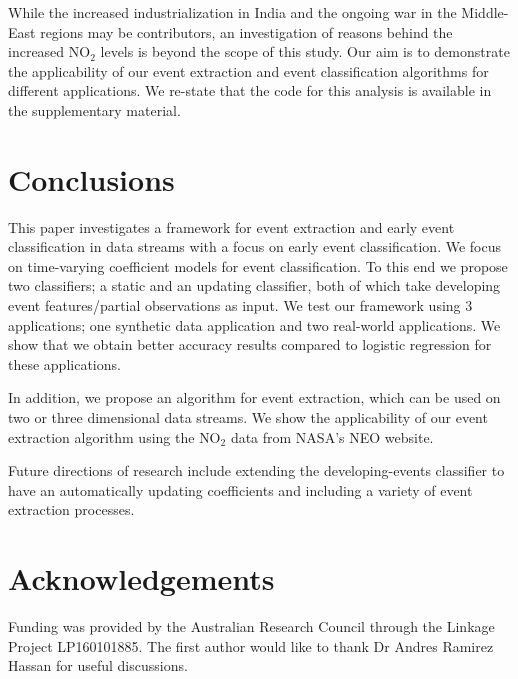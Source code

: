 \documentclass[a4paper,11pt]{article}
\begin{document}
While the increased industrialization in India and the ongoing war in the Middle-East regions may be contributors, an investigation of reasons behind the increased $\text{NO}_2$ levels is beyond the scope of this study. Our aim is to demonstrate the applicability of our event extraction and event classification algorithms for different applications. We re-state that the code for this analysis is available in the supplementary material.

\section{Conclusions}\label{sec:Conclusions}

This paper investigates a framework for event extraction and early event classification in data streams with a focus on early event classification. We focus on time-varying coefficient models for event classification. To this end we propose two classifiers; a static and an updating classifier, both of which take developing event features/partial observations as input. We test our framework using 3 applications; one synthetic data application and two real-world applications. We show that we obtain better accuracy results compared to logistic regression for these applications.

In addition, we propose an algorithm for event extraction, which can be used on two or three dimensional data streams. We show the applicability of our event extraction algorithm using the $\text{NO}_2$ data from NASA's NEO website.

Future directions of research include extending the developing-events classifier to have an automatically updating coefficients and including a variety of event extraction processes.

\section*{Acknowledgements}

Funding was provided by the Australian Research Council through the Linkage Project LP160101885. The first author would like to thank Dr Andres Ramirez Hassan for useful discussions.

\footnotesize


\end{document}
